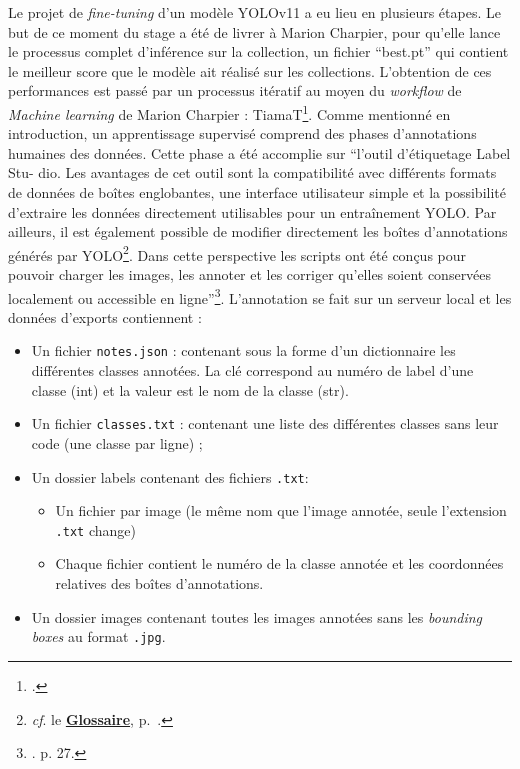 Le projet de \textit{fine-tuning} d'un modèle YOLOv11 a eu lieu en plusieurs étapes. Le but de ce moment du stage a été de livrer à Marion Charpier, pour qu'elle lance le processus complet d'inférence sur la collection, un fichier \enquote{best.pt} qui contient le meilleur score que le modèle ait réalisé sur les collections. L'obtention de ces performances est passé par un processus itératif au moyen du \textit{workflow} de \textit{Machine learning} de Marion Charpier : TiamaT\footnote{\cite{chaouabti_chaouabtitiamat_2025}.}. Comme mentionné en introduction, un apprentissage supervisé comprend des phases d'annotations humaines des données. Cette phase a été accomplie sur \enquote{l’outil d’étiquetage Label Stu-
dio. Les avantages de cet outil sont la compatibilité avec différents
formats de données de boîtes englobantes, une interface utilisateur simple et la possibilité
d’extraire les données directement utilisables pour un entraînement YOLO.
Par ailleurs, il est également possible de modifier directement les boîtes d’annotations générés par YOLO\footnote{\textit{cf}. le \textbf{\hyperref[sec:Glossaire]{Glossaire}}, p.~\pageref{sec:Glossaire}.}. Dans cette perspective les scripts ont été conçus pour pouvoir charger les images, les annoter et les corriger qu’elles soient conservées localement ou accessible en ligne}\footnote{\cite{charpier_computer_2023}. p. 27.}. L’annotation se fait sur un serveur local et les données d’exports contiennent : 
\begin{itemize}
    \item Un fichier \texttt{notes.json} : contenant sous la forme d'un dictionnaire les différentes classes annotées. La clé correspond au numéro de label d'une classe (int) et la valeur est le nom de la classe (str).
    \item Un fichier \texttt{classes.txt} : contenant une liste des différentes classes sans leur code (une classe par ligne) ;
    \item Un dossier labels contenant des fichiers \texttt{.txt}:
    \begin{itemize}
        \item Un fichier par image (le même nom que l'image annotée, seule l'extension \texttt{.txt} change)
        \item Chaque fichier contient le numéro de la classe annotée et les coordonnées relatives des boîtes d’annotations. 
    \end{itemize}
    \item Un dossier images contenant toutes les images annotées sans les \textit{bounding boxes} au format \texttt{.jpg}.
\end{itemize}

